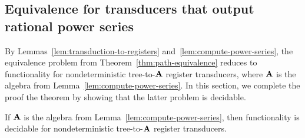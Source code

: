 \subsection{Equivalence for transducers that output rational power series}
\label{sec:decide-power-series}
By Lemmas~\ref{lem:transduction-to-registers} and~\ref{lem:compute-power-series}, the  equivalence problem from Theorem~\ref{thm:path-equivalence} reduces to functionality for nondeterministic tree-to-$\mathbf{A}$ register transducers, where $\mathbf{A}$ is the algebra from Lemma~\ref{lem:compute-power-series}. In this section, we complete the proof the theorem by showing that the latter problem is decidable.
\begin{lemma}\label{lem:functionality-decidable-power-series} If $\mathbf{A}$ is the algebra from Lemma~\ref{lem:compute-power-series}, then functionality is decidable for nondeterministic tree-to-$\mathbf{A}$ register transducers. 
\end{lemma}
